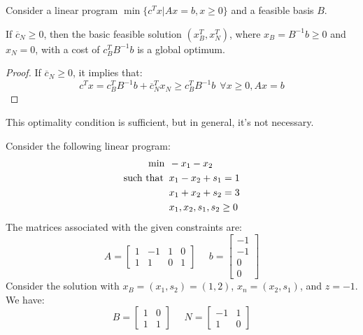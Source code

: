 \documentclass[12pt, a4paper]{report}
\begin{document}
    Consider a linear program $\min\{c^Tx|Ax=b,x\geq 0\}$ and a feasible basis $B$. 
    \begin{proposition}
        If $\overline{c}_N \geq 0$, then the basic feasible solution $(x_B^T,x_N^T)$, where $x_B=B^{-1}b \geq 0$ and $x_N = 0$, with a cost of  $c_B^TB^{-1}b$ is a global optimum. 
    \end{proposition}
    \begin{proof}
        If $\overline{c}_N \geq 0$, it implies that: 
        \[c^Tx=c_B^TB^{-1}b+\overline{c}_N^Tx_N \geq c_B^TB^{-1}b \:\: \forall x \geq 0, Ax=b\]
    \end{proof}
    This optimality condition is sufficient, but in general, it's not necessary.
    \begin{example}
        Consider the following linear program: 
        \begin{align*}
            \min                      \:&\: -x_1-x_2          \\
            \textnormal{such that }     &\: x_1-x_2+s_1=1  \\
                                        &\: x_1+x_2+s_2=3  \\
                                        &\: x_1,x_2,s_1,s_2 \geq 0
        \end{align*}
        The matrices associated with the given constraints are:
        \[
        A=
        \begin{bmatrix}
            1 & -1 & 1 & 0  \\
            1 & 1 & 0 & 1 
        \end{bmatrix}
        \:\:\:\:\:\:
        b=
        \begin{bmatrix}
            -1 \\
            -1 \\
            0  \\
            0
        \end{bmatrix}
        \]
        Consider the solution with $x_B=(x_1,s_2)=(1,2)$, $x_n=(x_2,s_1)$, and $z=-1$. 
        We have:
        \[
        B=
        \begin{bmatrix}
            1 & 0  \\
            1 & 1  
        \end{bmatrix}
        \:\:\:\:\:\:
        N=
        \begin{bmatrix}
            -1 & 1  \\
            1  & 0  
        \end{bmatrix}
        \]

\end{example}
\end{document}
